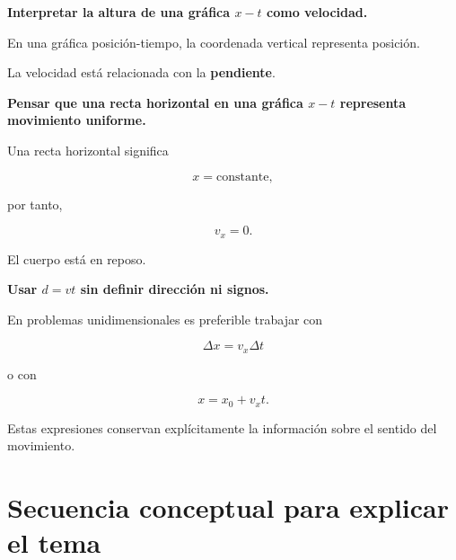 \begin{errorfrecuente}
\textbf{Interpretar la altura de una gráfica \(x-t\) como velocidad.}

En una gráfica posición-tiempo, la coordenada vertical representa posición.

La velocidad está relacionada con la \textbf{pendiente}.
\end{errorfrecuente}


\begin{errorfrecuente}
\textbf{Pensar que una recta horizontal en una gráfica \(x-t\) representa
movimiento uniforme.}

Una recta horizontal significa

\[ x=\text{constante}, \]

por tanto,

\[ v_x=0. \]

El cuerpo está en reposo.
\end{errorfrecuente}


\begin{errorfrecuente}
\textbf{Usar \(d=vt\) sin definir dirección ni signos.}

En problemas unidimensionales es preferible trabajar con

\[ \Delta x=v_x\Delta t \]

o con

\[ x=x_0+v_xt. \]

Estas expresiones conservan explícitamente la información sobre el sentido
del movimiento.
\end{errorfrecuente}


\section{Secuencia conceptual para explicar el tema}

